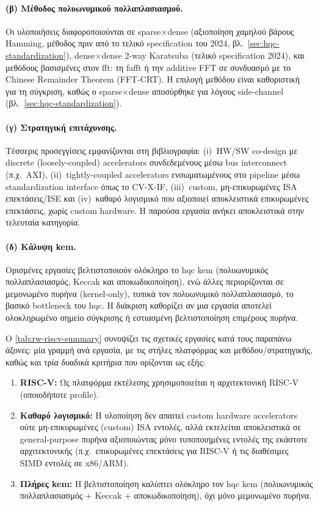 \paragraph{(β) Μέθοδος πολυωνυμικού πολλαπλασιασμού.}
Οι υλοποιήσεις διαφοροποιούνται σε sparse$\times$dense (αξιοποίηση χαμηλού βάρους
Hamming, μέθοδος πριν από το τελικό specification του 2024,
βλ.~\cref{sec:hqc-standardization}), dense$\times$dense 2-way Karatsuba (τελικό
specification 2024), και μεθόδους βασισμένες στον \gls{fft}: τη \gls{fafft} ή την additive FFT σε
συνδυασμό με το Chinese Remainder Theorem (FFT-CRT). Η επιλογή μεθόδου είναι 
καθοριστική για τη σύγκριση, καθώς ο sparse$\times$dense αποσύρθηκε για λόγους side-channel
(βλ.~\cref{sec:hqc-standardization}).

\paragraph{(γ) Στρατηγική επιτάχυνσης.}
Τέσσερις προσεγγίσεις εμφανίζονται στη βιβλιογραφία: (i)~HW/SW co-design με
discrete (loosely-coupled) accelerators συνδεδεμένους μέσω bus interconnect
(π.χ.\ AXI), (ii)~tightly-coupled accelerators ενσωματωμένους στο pipeline μέσω
standardization interface όπως το CV-X-IF, (iii)~custom, μη-επικυρωμένες ISA
επεκτάσεις/ISE και (iv)~καθαρό λογισμικό που αξιοποιεί αποκλειστικά επικυρωμένες επεκτάσεις, χωρίς custom hardware. Η παρούσα εργασία ανήκει
αποκλειστικά στην τελευταία κατηγορία.

\paragraph{(δ) Κάλυψη \gls{kem}.}
Ορισμένες εργασίες βελτιστοποιούν ολόκληρο το \gls{hqc} \gls{kem} (πολυωνυμικός
πολλαπλασιασμός, Keccak και αποκωδικοποίηση), ενώ άλλες περιορίζονται σε
μεμονωμένο πυρήνα (kernel-only), τυπικά τον πολυωνυμικό πολλαπλασιασμό, το βασικό bottleneck του \gls{hqc}. Η
διάκριση καθορίζει αν μια εργασία αποτελεί ολοκληρωμένο σημείο σύγκρισης ή
εστιασμένη βελτιστοποίηση επιμέρους πυρήνα.

\bigskip
Ο \cref{tab:rw-riscv-summary} συνοψίζει τις σχετικές εργασίες κατά τους παραπάνω
άξονες: μία γραμμή ανά εργασία, με τις στήλες πλατφόρμας και μεθόδου/στρατηγικής,
καθώς και τρία δυαδικά κριτήρια που ορίζονται ως εξής:
\begin{enumerate}
\item \textbf{RISC-V:} Ως πλατφόρμα εκτέλεσης χρησιμοποιείται η
    αρχιτεκτονική RISC-V (οποιοδήποτε profile).
  \item \textbf{Καθαρό λογισμικό:} Η υλοποίηση δεν απαιτεί custom hardware
    accelerators ούτε μη-επικυρωμένες (custom) ISA εντολές, αλλά εκτελείται
    αποκλειστικά σε general-purpose πυρήνα αξιοποιώντας μόνο τυποποιημένες
    εντολές της εκάστοτε αρχιτεκτονικής (π.χ.\ επικυρωμένες επεκτάσεις
    για RISC-V ή τις διαθέσιμες SIMD εντολές σε x86/ARM).
  \item \textbf{Πλήρες \gls{kem}:} Η βελτιστοποίηση καλύπτει ολόκληρο τον 
    \gls{hqc} \gls{kem} (πολυωνυμικός πολλαπλασιασμός + Keccak + 
    αποκωδικοποίηση), όχι μόνο μεμονωμένο πυρήνα.
\end{enumerate}

